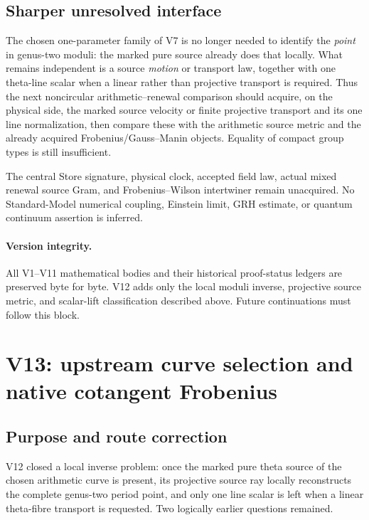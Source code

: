 \documentclass[11pt]{article}
\theoremstyle{definition}
\theoremstyle{remark}
\begin{document}
\subsection{Sharper unresolved interface}
The chosen one-parameter family of V7 is no longer needed to identify the
\emph{point} in genus-two moduli: the marked pure source already does that
locally.  What remains independent is a source \emph{motion} or transport law,
together with one theta-line scalar when a linear rather than projective
transport is required.  Thus the next noncircular arithmetic--renewal
comparison should acquire, on the physical side, the marked source velocity or
finite projective transport and its one line normalization, then compare these
with the arithmetic source metric and the already acquired Frobenius/Gauss--Manin
objects.  Equality of compact group types is still insufficient.

The central Store signature, physical clock, accepted field law, actual mixed
renewal source Gram, and Frobenius--Wilson intertwiner remain unacquired.  No
Standard-Model numerical coupling, Einstein limit, GRH estimate, or quantum
continuum assertion is inferred.

\paragraph{Version integrity.}
All V1--V11 mathematical bodies and their historical proof-status ledgers are
preserved byte for byte.  V12 adds only the local moduli inverse, projective
source metric, and scalar-lift classification described above.  Future
continuations must follow this block.
\section{V13: upstream curve selection and native cotangent Frobenius}
\label{sec:v13-context}

\subsection{Purpose and route correction}
V12 closed a local inverse problem: once the marked pure theta source of the
chosen arithmetic curve is present, its projective source ray locally
reconstructs the complete genus-two period point, and only one line scalar is
left when a linear theta-fibre transport is requested.  Two logically earlier
questions remained.
\end{document}
